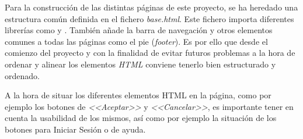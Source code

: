 Para la construcción de las distintas páginas de este proyecto, se ha heredado una estructura común definida en el fichero \textit{base.html}. Este fichero importa diferentes librerías como  y . También añade la barra de navegación y otros elementos comunes a todas las páginas como el pie (\textit{footer}). Es por ello que desde el comienzo del proyecto y con la finalidad de evitar futuros problemas a la hora de ordenar y alinear los elementos \textit{HTML} conviene tenerlo bien estructurado y ordenado. 


A la hora de situar los diferentes elementos HTML en la página, como por ejemplo los botones de \textit{<<Aceptar>>} y \textit{<<Cancelar>>}, es importante tener en cuenta la usabilidad de los mismos, así como por ejemplo la situación de los botones para Iniciar Sesión o de ayuda.

